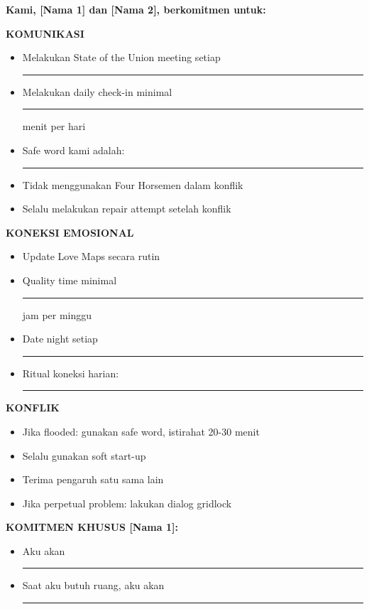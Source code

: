 \begin{exercisebox}
\textbf{Kami, [Nama 1] dan [Nama 2], berkomitmen untuk:}

\vspace{0.3cm}
\textbf{KOMUNIKASI}
\begin{itemize}[itemsep=0.15cm]
    \item[$\square$] Melakukan State of the Union meeting setiap \rule{3cm}{0.4pt}
    \item[$\square$] Melakukan daily check-in minimal \rule{1cm}{0.4pt} menit per hari
    \item[$\square$] Safe word kami adalah: \rule{5cm}{0.4pt}
    \item[$\square$] Tidak menggunakan Four Horsemen dalam konflik
    \item[$\square$] Selalu melakukan repair attempt setelah konflik
\end{itemize}

\textbf{KONEKSI EMOSIONAL}
\begin{itemize}[itemsep=0.15cm]
    \item[$\square$] Update Love Maps secara rutin
    \item[$\square$] Quality time minimal \rule{1cm}{0.4pt} jam per minggu
    \item[$\square$] Date night setiap \rule{3cm}{0.4pt}
    \item[$\square$] Ritual koneksi harian: \rule{8cm}{0.4pt}
\end{itemize}

\textbf{KONFLIK}
\begin{itemize}[itemsep=0.15cm]
    \item[$\square$] Jika flooded: gunakan safe word, istirahat 20-30 menit
    \item[$\square$] Selalu gunakan soft start-up
    \item[$\square$] Terima pengaruh satu sama lain
    \item[$\square$] Jika perpetual problem: lakukan dialog gridlock
\end{itemize}

\textbf{KOMITMEN KHUSUS [Nama 1]:}
\begin{itemize}[itemsep=0.15cm]
    \item[$\square$] Aku akan \rule{10cm}{0.4pt}
    \item[$\square$] Saat aku butuh ruang, aku akan \rule{8cm}{0.4pt}
\end{itemize}


\end{exercisebox}
